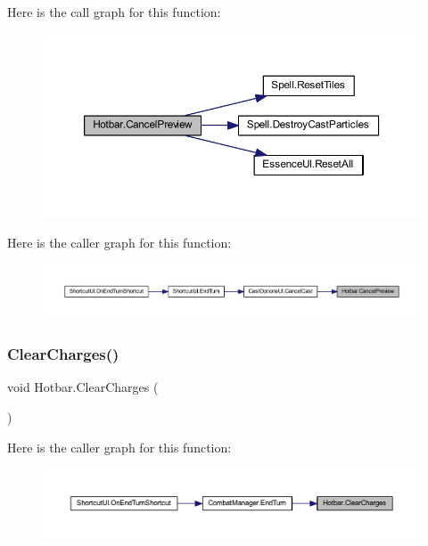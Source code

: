 Here is the call graph for this function\+:
\nopagebreak
\begin{figure}[H]
\begin{center}
\leavevmode
\includegraphics[width=350pt]{class_hotbar_a0c213365074f45fd1b1010eabe3f3d4d_cgraph}
\end{center}
\end{figure}
Here is the caller graph for this function\+:
\nopagebreak
\begin{figure}[H]
\begin{center}
\leavevmode
\includegraphics[width=350pt]{class_hotbar_a0c213365074f45fd1b1010eabe3f3d4d_icgraph}
\end{center}
\end{figure}
\mbox{\label{class_hotbar_ab54a6d27db19b4ed21014a782d74b3d1}} 
\subsubsection{\texorpdfstring{ClearCharges()}{ClearCharges()}}
{\footnotesize\ttfamily void Hotbar.\+Clear\+Charges (\begin{DoxyParamCaption}{ }\end{DoxyParamCaption})}

Here is the caller graph for this function\+:
\nopagebreak
\begin{figure}[H]
\begin{center}
\leavevmode
\includegraphics[width=350pt]{class_hotbar_ab54a6d27db19b4ed21014a782d74b3d1_icgraph}
\end{center}
\end{figure}
\mbox{\label{class_hotbar_a535ef71789d10c417b86bdd194e3e5b7}} 

